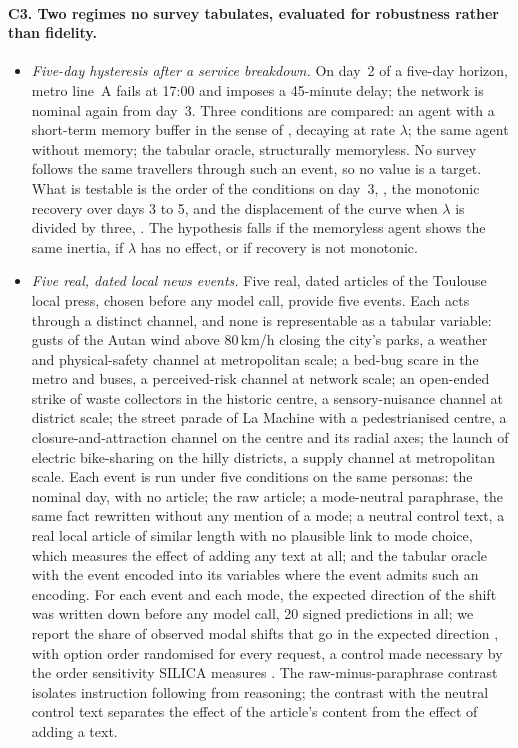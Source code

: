 \paragraph{C3. Two regimes no survey tabulates, evaluated for robustness rather than fidelity.}

\begin{itemize}
  \item \emph{Five-day hysteresis after a service breakdown.} On day~2 of a five-day horizon, metro line~A fails at 17:00 and imposes a 45-minute delay; the network is nominal again from day~3. %
  Three conditions are compared: an agent with a short-term memory buffer in the sense of \citet{park2023generative}, decaying at rate $\lambda$; the same agent without memory; the tabular oracle, structurally memoryless. No survey follows the same travellers through such an event, so no value is a target. What is testable is the order of the conditions on day~3, , the monotonic recovery over days 3 to 5, and the displacement of the curve when $\lambda$ is divided by three, . The hypothesis falls if the memoryless agent shows the same inertia, if $\lambda$ has no effect, or if recovery is not monotonic.
  \item \emph{Five real, dated local news events.} Five real, dated articles of the Toulouse local press, chosen before any model call, provide five events. %
  Each acts through a distinct channel, and none is representable as a tabular variable: gusts of the Autan wind above 80\,km/h closing the city's parks, a weather and physical-safety channel at metropolitan scale; a bed-bug scare in the metro and buses, a perceived-risk channel at network scale; an open-ended strike of waste collectors in the historic centre, a sensory-nuisance channel at district scale; the street parade of La Machine with a pedestrianised centre, a closure-and-attraction channel on the centre and its radial axes; the launch of electric bike-sharing on the hilly districts, a supply channel at metropolitan scale. Each event is run under five conditions on the same personas: the nominal day, with no article; the raw article; a mode-neutral paraphrase, the same fact rewritten without any mention of a mode; a neutral control text, a real local article of similar length with no plausible link to mode choice, which measures the effect of adding any text at all; and the tabular oracle with the event encoded into its variables where the event admits such an encoding. For each event and each mode, the expected direction of the shift was written down before any model call, 20 signed predictions in all; we report the share of observed modal shifts that go in the expected direction , with option order randomised for every request, a control made necessary by the order sensitivity SILICA measures \citep{bintareaf2026silica}. The raw-minus-paraphrase contrast isolates instruction following from reasoning; the contrast with the neutral control text separates the effect of the article's content from the effect of adding a text.
\end{itemize}

